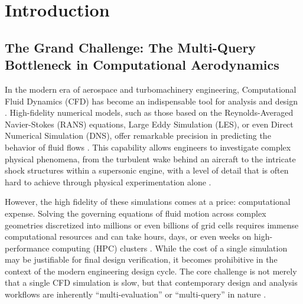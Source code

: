 \chapter{Introduction}

\section{The Grand Challenge: The Multi-Query Bottleneck in Computational Aerodynamics}


In the modern era of aerospace and turbomachinery engineering, Computational Fluid Dynamics (CFD) has become an indispensable tool for analysis and design \citep{Spalart2016}. High-fidelity numerical models, such as those based on the Reynolds-Averaged Navier-Stokes (RANS) equations, Large Eddy Simulation (LES), or even Direct Numerical Simulation (DNS), offer remarkable precision in predicting the behavior of fluid flows \citep{Pereira2021}. This capability allows engineers to investigate complex physical phenomena, from the turbulent wake behind an aircraft to the intricate shock structures within a supersonic engine, with a level of detail that is often hard to achieve through physical experimentation alone \citep{Schiestel2022}.

However, the high fidelity of these simulations comes at a price: computational expense. Solving the governing equations of fluid motion across complex geometries discretized into millions or even billions of grid cells requires immense computational resources and can take hours, days, or even weeks on high-performance computing (HPC) clusters \citep{Slotnick2014}. While the cost of a single simulation may be justifiable for final design verification, it becomes prohibitive in the context of the modern engineering design cycle. The core challenge is not merely that a single CFD simulation is slow, but that contemporary design and analysis workflows are inherently ``multi-evaluation'' or ``multi-query'' in nature \citep{Bekemeyer2025}.

